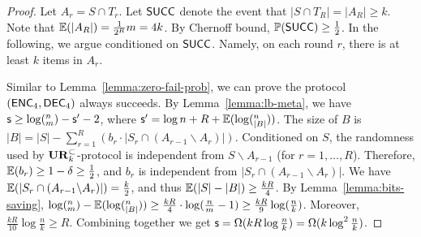 \begin{proof}
  Let $A_r=S\cap T_r$. 
  Let $\textsf{SUCC}$ denote the event that $|S\cap T_R|=|A_R|\ge k$. 
  Note that $\operatorname*{\mathbb{E}}(|A_R|)=\frac{1}{2^R}m=4k$. By Chernoff bound, $\operatorname*{\mathbb{P}}(\textsf{SUCC})\ge \frac{1}{2}$. 
  In the following, we argue conditioned on $\textsf{SUCC}$. Namely, on each round $r$, there is at least $k$ items in $A_r$.  
  
  Similar to Lemma~\ref{lemma:zero-fail-prob}, we can prove the protocol $(\textsf{ENC}_4,\textsf{DEC}_4)$ always succeeds. 
  By Lemma~\ref{lemma:lb-meta}, we have $\textsf{s}\ge \log (^n_m) - \textsf{s}' -2$, where $\textsf{s}'=\log n + R+ \operatorname*{\mathbb{E}}(\log (^n_{|B|}))$. 
  The size of $B$ is $|B|=|S|-\sum_{r=1}^{R}{(b_r \cdot |S_r \cap (A_{r-1}\backslash A_r)|)}$.
  Conditioned on $S$, the randomness used by $\mathbf{UR}_k^\subset$-protocol is independent from $S\backslash A_{r-1}$ (for $r=1, \ldots, R$).
  Therefore, $\operatorname*{\mathbb{E}}(b_r)\ge 1-\delta\ge \frac{1}{2}$, and $b_r$ is independent from $|S_r \cap (A_{r-1}\backslash A_r)|$. 
  We have $\operatorname*{\mathbb{E}}(|S_r \cap (A_{r-1}\backslash A_r)|)=\frac{k}{2}$, and thus $\operatorname*{\mathbb{E}}(|S|-|B|)\ge \frac{kR}{4}$. 
  By Lemma~\ref{lemma:bits-saving}, $\log (^n_m)-\operatorname*{\mathbb{E}}(\log (^n_{|B|}))\ge \frac{kR}{4}\cdot \log (\frac{n}{m}-1) \ge \frac{kR}{9}\log (\frac{n}{k})$.
  Moreover, $\frac{kR}{10}\log \frac{n}{k}\ge R$.  
  Combining together we get $\textsf{s} = \Omega(kR\log\frac{n}{k}) = \Omega(k\log^2 \frac{n}{k} )$.
\end{proof}
